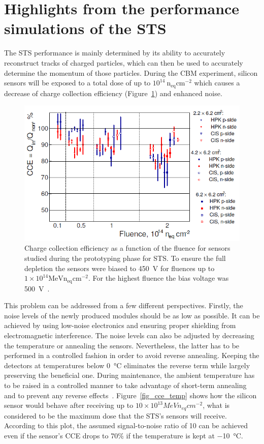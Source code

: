 \section{Highlights from the performance simulations of the STS}
The STS performance is mainly determined by its ability to accurately reconstruct tracks of charged particles, which can then be used to accurately determine the momentum of those particles. During the \gls{CBM} experiment, silicon sensors will be exposed to a total dose of up to $10^{14}~\mathrm{n_{eq}cm^{-2}}$ which causes a decrease of charge collection efficiency (Figure~\ref{fig_cce}) and enhanced noise. 

\begin{figure}[!h]
\centering
\includegraphics[width=0.8\columnwidth]{Chapter2/images/CCE.png}
\caption{Charge collection efficiency as a function of the fluence for sensors studied during the prototyping phase for \gls{STS}. To ensure the full depletion the sensors were biased to 450~V for fluences up to $1\times10^14\mathrm{MeV n_{eq}cm^{-2}}$. For the highest fluence the bias voltage was 500~V~\cite{Momot:2019lnx}.}
\label{fig_cce}
\end{figure}

This problem can be addressed from a few different perspectives. Firstly, the noise levels of the newly produced modules should be as low as possible. It can be achieved by using low-noise electronics and ensuring proper shielding from electromagnetic interference. The noise levels can also be adjusted by decreasing the temperature or annealing the sensors. Nevertheless, the latter has to be performed in a controlled fashion in order to avoid reverse annealing. Keeping the detectors at temperatures below \SI{0}{\celsius} eliminates the reverse term while largely preserving the beneficial one. During maintenance, the ambient temperature has to be raised in a controlled manner to take advantage of short-term annealing and to prevent any reverse effects~\cite{Hartmann:2017gzy}. Figure~\ref{fig_cce_temp} shows how the silicon sensor would behave after receiving up to $10\times10^{13} MeV n_{eq}cm^{-2}$, what is considered to be the maximum dose that the \gls{STS}'s sensors will receive. According to this plot, the assumed signal-to-noise ratio of 10 can be achieved even if the sensor's \gls{CCE} drops to 70\% if the temperature is kept at \SI{-10}{\celsius}.

